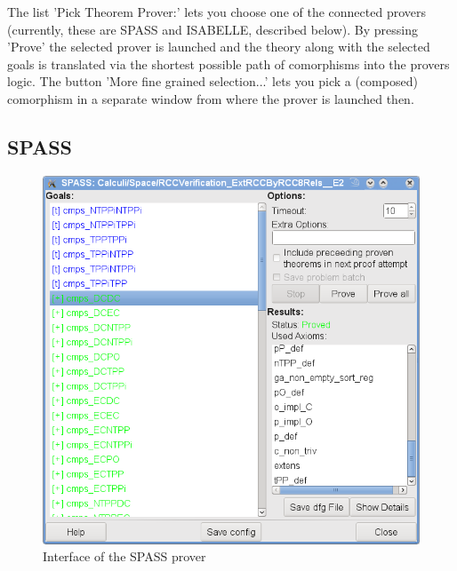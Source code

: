 \documentclass{article}
\newcommand{\normalTEXTSC}[2]{{#1\scriptsize#2}}
\newcommand     {\Isabelle}{\normalTEXTSC{I}{SABELLE}\xspace}
\begin{document}
The list 'Pick Theorem Prover:' lets you choose one of the connected
provers (currently, these are SPASS and \Isabelle, described below). By
pressing 'Prove' the selected prover is launched and the theory along
with the selected goals is translated via the shortest possible path
of comorphisms into the provers logic. The button 'More fine grained
selection...' lets you pick a (composed) comorphism in a separate
window from where the prover is launched then.



\subsection*{SPASS}

\begin{figure}
\centering
\includegraphics[width=\textwidth]{spassGUI1}
\caption{Interface of the SPASS prover\label{fig:SPASS_GUI}}
\end{figure}
\end{document}
